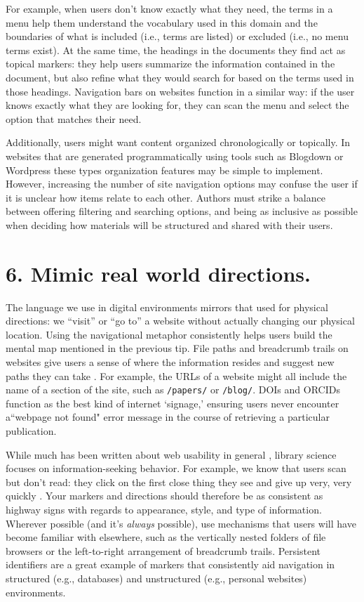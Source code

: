 \documentclass[10pt,letterpaper]{article}
\newcommand{\rulemajor}[1]{\section*{#1}}
\begin{document}
For example, when users don't know exactly what they need, the terms in a menu
help them understand the vocabulary used in this domain and the boundaries of
what is included (i.e., terms are listed) or excluded (i.e., no menu terms
exist). At the same time, the headings in the documents they find act as
topical markers: they help users summarize the information contained in the
document, but also refine what they would search for based on the terms used in
those headings. Navigation bars on websites function in a similar way: if the
user knows exactly what they are looking for, they can scan the menu and select
the option that matches their need.

Additionally, users might want content organized chronologically or topically.
In websites that are generated programmatically using tools such as
Blogdown\cite{Xie2017} or Wordpress \cite{Williams2015} these types organization
features may be simple to implement. However, increasing the number of site
navigation options may confuse the user if it is unclear how items relate to
each other. Authors must strike a balance between offering filtering and
searching options, and being as inclusive as possible when deciding how
materials will be structured and shared with their users.

\rulemajor{6. Mimic real world directions.}

The language we use in digital environments mirrors that used for physical
directions: we ``visit'' or ``go to'' a website without actually changing our
physical location. Using the navigational metaphor consistently helps users
build the mental map mentioned in the previous tip. File paths and breadcrumb
trails on websites give users a sense of where the information resides and
suggest new paths they can take \cite{Krug2014}. For example, the URLs of a
website might all include the name of a section of the site, such as
\texttt{/papers/} or \texttt{/blog/}. DOIs and ORCIDs function as the best
kind of internet `signage,' ensuring users never encounter a``webpage not found"
error message in the course of retrieving a particular publication.

While much has been written about web usability in general
\cite{Covert2014,NNG2020}, library science focuses on information-seeking
behavior. For example, we know that users scan but don't read: they click on
the first close thing they see and give up very, very quickly \cite{Bates2002}.
Your markers and directions should therefore be as consistent as highway signs
with regards to appearance, style, and type of information. Wherever possible
(and it's \emph{always} possible), use mechanisms that users will have become
familiar with elsewhere, such as the vertically nested folders of file browsers
or the left-to-right arrangement of breadcrumb trails. Persistent identifiers
are a great example of markers that consistently aid navigation in structured
(e.g., databases) and unstructured (e.g., personal websites) environments.
\end{document}
